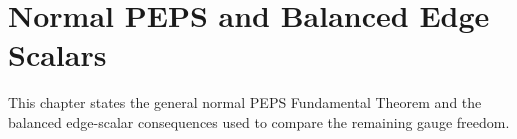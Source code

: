 
\chapter{Normal PEPS and Balanced Edge Scalars}%
\label{ch:peps_normal_capstone}

This chapter states the general normal PEPS Fundamental Theorem and the
balanced edge-scalar consequences used to compare the remaining gauge freedom.



